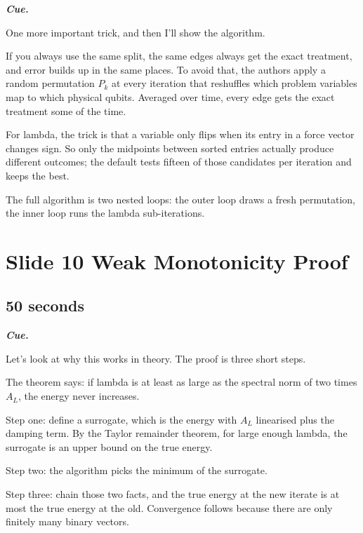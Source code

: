 \documentclass[11pt,a4paper]{article}
\newenvironment{cue}{%
  \par\noindent
  \begin{minipage}{\linewidth}
  \color{muted}\small\itshape
  \textbf{\color{accent}\upshape Cue.}~%
}{%
  \end{minipage}\par\medskip
}
\begin{document}
\begin{cue}
One more important trick, and then I'll show the algorithm.
\end{cue}

If you always use the same split, the same edges always get the exact treatment, and error builds up in the same places. To avoid that, the authors apply a random permutation $P_k$ at every iteration that reshuffles which problem variables map to which physical qubits. Averaged over time, every edge gets the exact treatment some of the time.

For lambda, the trick is that a variable only flips when its entry in a force vector changes sign. So only the midpoints between sorted entries actually produce different outcomes; the default tests fifteen of those candidates per iteration and keeps the best.

The full algorithm is two nested loops: the outer loop draws a fresh permutation, the inner loop runs the lambda sub-iterations.

\section*{Slide 10 \quad Weak Monotonicity Proof}
\subsection*{50 seconds}

\begin{cue}
Let's look at why this works in theory. The proof is three short steps.
\end{cue}

The theorem says: if lambda is at least as large as the spectral norm of two times $A_L$, the energy never increases.

Step one: define a surrogate, which is the energy with $A_L$ linearised plus the damping term. By the Taylor remainder theorem, for large enough lambda, the surrogate is an upper bound on the true energy.

Step two: the algorithm picks the minimum of the surrogate.

Step three: chain those two facts, and the true energy at the new iterate is at most the true energy at the old. Convergence follows because there are only finitely many binary vectors.

\end{document}
